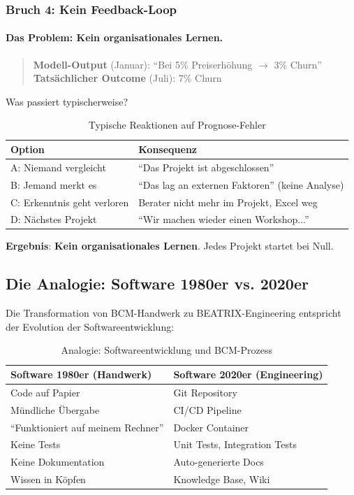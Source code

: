 \subsubsection{Bruch 4: Kein Feedback-Loop}

\paragraph{Das Problem: Kein organisationales Lernen.}

\begin{quote}
\textbf{Modell-Output} (Januar): ``Bei 5\% Preiserhöhung $\rightarrow$ 3\% Churn'' \\
\textbf{Tatsächlicher Outcome} (Juli): 7\% Churn
\end{quote}

Was passiert typischerweise?

\begin{table}[h]
\centering
\caption{Typische Reaktionen auf Prognose-Fehler}
\begin{tabular}{@{}ll@{}}
\toprule
\textbf{Option} & \textbf{Konsequenz} \\
\midrule
A: Niemand vergleicht & ``Das Projekt ist abgeschlossen'' \\
B: Jemand merkt es & ``Das lag an externen Faktoren'' (keine Analyse) \\
C: Erkenntnis geht verloren & Berater nicht mehr im Projekt, Excel weg \\
D: Nächstes Projekt & ``Wir machen wieder einen Workshop...'' \\
\bottomrule
\end{tabular}
\end{table}

\textbf{Ergebnis}: \textbf{Kein organisationales Lernen}. Jedes Projekt startet bei Null.

\subsection{Die Analogie: Software 1980er vs. 2020er}

Die Transformation von BCM-Handwerk zu BEATRIX-Engineering entspricht der Evolution der Softwareentwicklung:

\begin{table}[h]
\centering
\caption{Analogie: Softwareentwicklung und BCM-Prozess}
\begin{tabular}{@{}p{5.5cm}p{5.5cm}@{}}
\toprule
\textbf{Software 1980er (Handwerk)} & \textbf{Software 2020er (Engineering)} \\
\midrule
Code auf Papier & Git Repository \\
Mündliche Übergabe & CI/CD Pipeline \\
``Funktioniert auf meinem Rechner'' & Docker Container \\
Keine Tests & Unit Tests, Integration Tests \\
Keine Dokumentation & Auto-generierte Docs \\
Wissen in Köpfen & Knowledge Base, Wiki \\
\bottomrule
\end{tabular}
\end{table}

